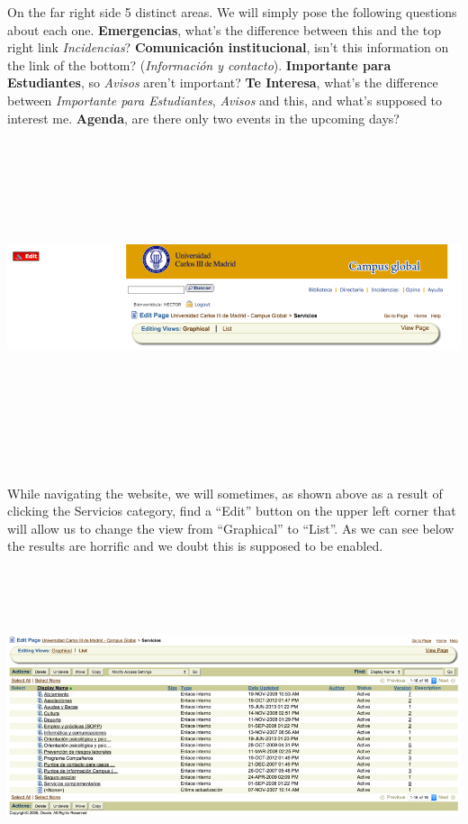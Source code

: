\documentclass{article}
\begin{document}
On the far right side 5 distinct areas. We will simply pose the following questions about each one.
\textbf{Emergencias}, what’s the difference between this and the top right link \textit{Incidencias}? \textbf{Comunicación institucional}, isn’t this information on the link of the bottom? (\textit{Información y contacto}).
\textbf{Importante para Estudiantes}, so \textit{Avisos} aren’t important?
\textbf{Te Interesa}, what’s the difference between \textit{Importante para Estudiantes}, \textit{Avisos} and this, and what’s supposed to interest me.
\textbf{Agenda}, are there only two events in the upcoming days? \vspace{0.3cm} \\
\includegraphics[width=15cm, height=10cm, keepaspectratio]{edit} 

While navigating the website, we will sometimes, as shown above as a result of clicking the Servicios category, find a “Edit” button on the upper left corner that will allow us to change the view from “Graphical” to “List”. As we can see below the results are horrific and we doubt this is supposed to be enabled. \vspace{0.2cm}\\

\includegraphics[width=15cm, height=10cm, keepaspectratio]{editresult}
\end{document}
